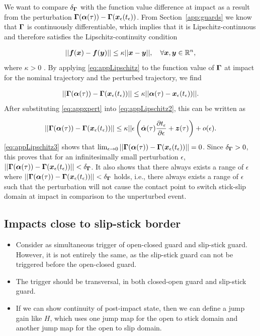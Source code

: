\documentclass[DC2017114Bouma.tex]{subfiles}
\begin{document}
We want to compare $\delta_{\boldsymbol{\Gamma}}$ with the function value difference at impact as a result from the perturbation $\boldsymbol{\Gamma}(\boldsymbol{\alpha}(\tau)) - \boldsymbol{\Gamma}({\boldsymbol{x}}_\epsilon(t_\epsilon))$. From Section~\ref{app:guards} we know that $\boldsymbol{\Gamma}$ is continuously differentiable, which implies that it is Lipschitz-continuous and therefore satisfies the Lipschitz-continuity condition

\begin{align}
||{\boldsymbol{f}}({\boldsymbol{x}})-{\boldsymbol{f}}({\boldsymbol{y}})|| \leq \kappa||{\boldsymbol{x}}-{\boldsymbol{y}}||,\quad \forall {\boldsymbol{x}},{\boldsymbol{y}}\in\mathbb{R}^n,\label{eq:appLipschitz}
\end{align}
where $\kappa>0$ \cite{Leine2008}. By applying \eqref{eq:appLipschitz} to the function value of $\boldsymbol{\Gamma}$ at impact for the nominal trajectory and the perturbed trajectory, we find

\begin{align}
||\boldsymbol{\Gamma}(\boldsymbol{\alpha}(\tau)) - \boldsymbol{\Gamma}({\boldsymbol{x}}_\epsilon(t_\epsilon))||\leq \kappa||\boldsymbol{\alpha}(\tau)-{\boldsymbol{x}}_\epsilon(t_\epsilon))||.\label{eq:appLipschitz2}
\end{align}
After substituting \eqref{eq:appxpert} into \eqref{eq:appLipschitz2}, this can be written as

\begin{align}
||\boldsymbol{\Gamma}(\boldsymbol{\alpha}(\tau)) - \boldsymbol{\Gamma}({\boldsymbol{x}}_\epsilon(t_\epsilon))||\leq \kappa||\epsilon\left(\dot{\boldsymbol{\alpha}}(\tau)\frac{\partial t_\epsilon}{\partial \epsilon} + {\boldsymbol{z}}(\tau)\right) + o(\epsilon).\label{eq:appLipschitz3}
\end{align}
\eqref{eq:appLipschitz3} shows that $\lim_{\epsilon\rightarrow 0}||\boldsymbol{\Gamma}(\boldsymbol{\alpha}(\tau)) - \boldsymbol{\Gamma}({\boldsymbol{x}}_\epsilon(t_\epsilon))|| = 0$. Since $\delta_{\boldsymbol{\Gamma}}>0$, this proves that for an infinitesimally small perturbation $\epsilon$, $||\boldsymbol{\Gamma}(\boldsymbol{\alpha}(\tau)) - \boldsymbol{\Gamma}({\boldsymbol{x}}_\epsilon(t_\epsilon))||<\delta_{\boldsymbol{\Gamma}}$. It also shows that there always exists a range of $\epsilon$ where $||\boldsymbol{\Gamma}(\boldsymbol{\alpha}(\tau)) - \boldsymbol{\Gamma}({\boldsymbol{x}}_\epsilon(t_\epsilon))||<\delta_{\boldsymbol{\Gamma}}$ holds, i.e., there always exists a range of $\epsilon$ such that the perturbation will not cause the contact point to switch stick-slip domain at impact in comparison to the unperturbed event.

\subsection{Impacts close to slip-stick border}

\begin{itemize}
	\item Consider as simultaneous trigger of open-closed guard and slip-stick guard. However, it is not entirely the same, as the slip-stick guard can not be triggered before the open-closed guard.
	\item The trigger should be transversal, in both closed-open guard and slip-stick guard.
	\item If we can show continuity of post-impact state, then we can define a jump gain like $H$, which uses one jump map for the open to stick domain and another jump map for the open to slip domain.
\end{itemize}
\end{document}
